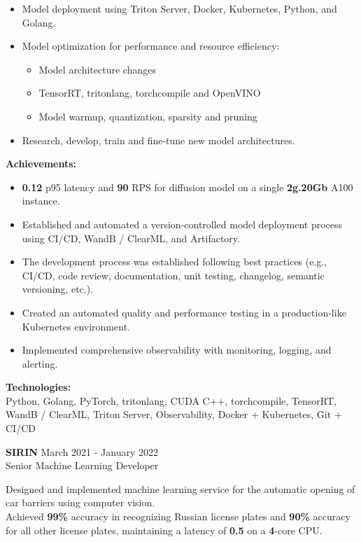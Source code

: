 \begin{itemize}[left=0pt, label={--}]
    \item Model deployment using Triton Server, Docker, Kubernetes, Python, and Golang.
    \item Model optimization for performance and resource efficiency:
    \begin{itemize}[topsep=0pt]
        \item Model architecture changes
        \item TensorRT, tritonlang, torchcompile and OpenVINO
        \item Model warmup, quantization, sparsity and pruning
    \end{itemize}
    \item Research, develop, train and fine-tune new model architectures.
\end{itemize}

\textbf{Achievements:}

\begin{itemize}[left=0pt, label={--}]
    \item \textbf{0.12} p95 latency and \textbf{90} RPS for diffusion model on a single \textbf{2g.20Gb} A100 instance.
    \item Established and automated a version-controlled model deployment process using CI/CD, WandB / ClearML, and Artifactory.
    \item The development process was established following best practices (e.g., CI/CD, code review, documentation, unit testing, changelog, semantic versioning, etc.).
    \item Created an automated quality and performance testing in a production-like Kubernetes environment.
    \item Implemented comprehensive observability with monitoring, logging, and alerting.
\end{itemize}

\textbf{Technologies:} \\
Python, Golang, PyTorch, tritonlang, CUDA C++, torchcompile, TensorRT, WandB / ClearML, Triton Server, Observability, Docker + Kubernetes, Git + CI/CD

\textbf{SIRIN} \hfill March 2021 - January 2022 \\
Senior Machine Learning Developer

Designed and implemented machine learning service for the automatic opening of car barriers using computer vision. \\
Achieved \textbf{99\%} accuracy in recognizing Russian license plates and \textbf{90\%} accuracy for all other license plates, maintaining a latency of \textbf{0.5} on a \textbf{4}-core CPU.

